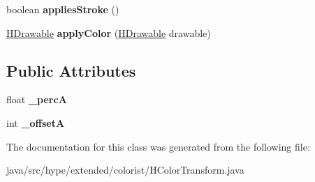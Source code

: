 \begin{DoxyCompactItemize}
\item 
\hypertarget{classhype_1_1extended_1_1colorist_1_1_h_color_transform_a165d3e32d76db84358f2d636fa76aeb4}{boolean {\bfseries applies\-Stroke} ()}\label{classhype_1_1extended_1_1colorist_1_1_h_color_transform_a165d3e32d76db84358f2d636fa76aeb4}

\item 
\hypertarget{classhype_1_1extended_1_1colorist_1_1_h_color_transform_ad2035984cdbf4309bbea988610fffadf}{\hyperlink{classhype_1_1core_1_1drawable_1_1_h_drawable}{H\-Drawable} {\bfseries apply\-Color} (\hyperlink{classhype_1_1core_1_1drawable_1_1_h_drawable}{H\-Drawable} drawable)}\label{classhype_1_1extended_1_1colorist_1_1_h_color_transform_ad2035984cdbf4309bbea988610fffadf}

\end{DoxyCompactItemize}
\subsection*{Public Attributes}
\begin{DoxyCompactItemize}
\item 
\hypertarget{classhype_1_1extended_1_1colorist_1_1_h_color_transform_a1af58b6a8e76703e42adf54975b236fa}{float {\bfseries \-\_\-perc\-A}}\label{classhype_1_1extended_1_1colorist_1_1_h_color_transform_a1af58b6a8e76703e42adf54975b236fa}

\item 
\hypertarget{classhype_1_1extended_1_1colorist_1_1_h_color_transform_acb2f3bf3bf1a2d82a545f5f22dc9a0f4}{int {\bfseries \-\_\-offset\-A}}\label{classhype_1_1extended_1_1colorist_1_1_h_color_transform_acb2f3bf3bf1a2d82a545f5f22dc9a0f4}

\end{DoxyCompactItemize}


The documentation for this class was generated from the following file\-:\begin{DoxyCompactItemize}
\item 
java/src/hype/extended/colorist/H\-Color\-Transform.\-java\end{DoxyCompactItemize}
